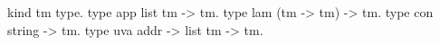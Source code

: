   kind tm  type.
  type app list tm -> tm.
  type lam (tm -> tm) -> tm.
  type con string -> tm.
  type uva addr -> list tm -> tm.
